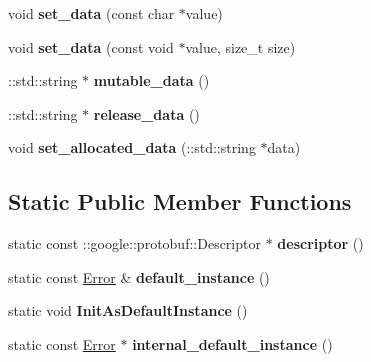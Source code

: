 \begin{DoxyCompactItemize}
void {\bfseries set\+\_\+data} (const char $\ast$value)
\item 
\mbox{\label{classcoappbrpc_1_1Error_ab6fce8187d7f8b32aa627c394ff21ce1}} 
void {\bfseries set\+\_\+data} (const void $\ast$value, size\+\_\+t size)
\item 
\mbox{\label{classcoappbrpc_1_1Error_a43f80373d6775e1863b355c0bd80ac18}} 
\+::std\+::string $\ast$ {\bfseries mutable\+\_\+data} ()
\item 
\mbox{\label{classcoappbrpc_1_1Error_ae54fc2d7f0a102d5b7a3b55a61bd96a1}} 
\+::std\+::string $\ast$ {\bfseries release\+\_\+data} ()
\item 
\mbox{\label{classcoappbrpc_1_1Error_aeae3dd27dabf24258646616365846a22}} 
void {\bfseries set\+\_\+allocated\+\_\+data} (\+::std\+::string $\ast$data)
\end{DoxyCompactItemize}
\subsection*{Static Public Member Functions}
\begin{DoxyCompactItemize}
\item 
\mbox{\label{classcoappbrpc_1_1Error_a835816ae390a4823c3cda44d0eea4ac2}} 
static const \+::google\+::protobuf\+::\+Descriptor $\ast$ {\bfseries descriptor} ()
\item 
\mbox{\label{classcoappbrpc_1_1Error_ae4e0a093db086c07b372c9fed1b76b18}} 
static const \hyperlink{classcoappbrpc_1_1Error}{Error} \& {\bfseries default\+\_\+instance} ()
\item 
\mbox{\label{classcoappbrpc_1_1Error_a9ef5aed94b431be32ae561055e86da91}} 
static void {\bfseries Init\+As\+Default\+Instance} ()
\item 
\mbox{\label{classcoappbrpc_1_1Error_a054f12c7ba5aa48ac9e29c89eadfa00f}} 
static const \hyperlink{classcoappbrpc_1_1Error}{Error} $\ast$ {\bfseries internal\+\_\+default\+\_\+instance} ()
\end{DoxyCompactItemize}
